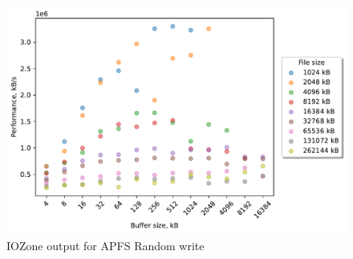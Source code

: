 \begin{figure}[!htb]
	\label{fig:bench_apfs_rnd_write}
	\begin{center}
		\includegraphics[width=1.0\textwidth]{figures/benchmarking/local/Random write.pdf}
	\end{center}
	\caption{IOZone output for \gls{APFS} Random write}
\end{figure}